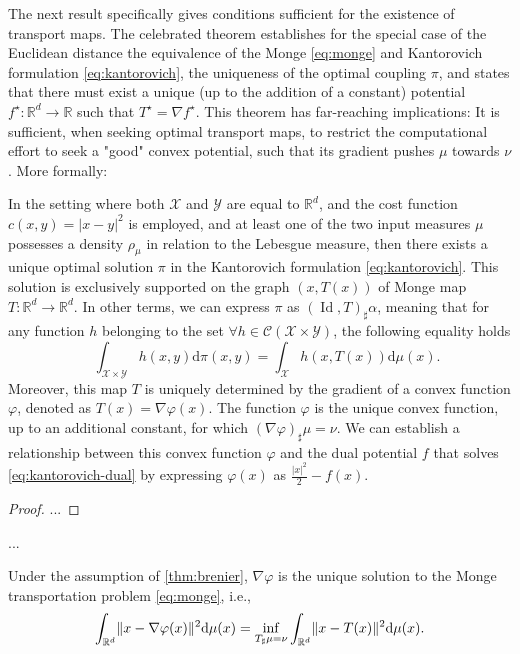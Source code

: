 The next result specifically gives conditions sufficient for the existence of transport maps.
The celebrated \citeauthor{brenier1987decomposition} theorem \citeyearpar{brenier1987decomposition} establishes for the special case of the Euclidean distance the equivalence of the Monge \eqref{eq:monge} and Kantorovich formulation  \eqref{eq:kantorovich}, the uniqueness of the optimal coupling $\pi$, and states that there must exist a unique (up to the addition of a constant) potential $f^\star:\mathbb{R}^d\rightarrow \mathbb{R}$ such that $T^\star = \nabla f^\star$. 
This theorem has far-reaching implications: It is sufficient, when seeking optimal transport maps, to restrict the computational effort to seek a "good" convex potential, such that its gradient pushes $\mu$ towards $\nu$. 
More formally:

\begin{theorem} \label{thm:brenier}
	In the setting where both $\mathcal{X}$ and $\mathcal{Y}$ are equal to $\mathbb{R}^d$, and the cost function $c(x, y) = |x-y|^2$ is employed, and at least one of the two input measures $\mu$ possesses a density $\rho_\mu$ in relation to the Lebesgue measure, then there exists a unique optimal solution $\pi$ in the Kantorovich formulation \eqref{eq:kantorovich}.
	This solution is exclusively supported on the graph $(x, T(x))$ of Monge map $T: \mathbb{R}^d \rightarrow \mathbb{R}^d$.
	In other terms, we can express $\pi$ as $(\operatorname{Id}, T)_{\sharp} \alpha$, meaning that for any function $h$ belonging to the set $\forall h \in \mathcal{C}(\mathcal{X} \times \mathcal{Y})$, the following equality holds
	$$
	\quad \int_{\mathcal{X} \times \mathcal{Y}} h(x, y) \mathrm{d} \pi(x, y)=\int_{\mathcal{X}} h(x, T(x)) \mathrm{d} \mu(x).
	$$
Moreover, this map $T$ is uniquely determined by the gradient of a convex function $\varphi$, denoted as $T(x)=\nabla \varphi(x)$. The function $\varphi$ is the unique convex function, up to an additional constant, for which $(\nabla \varphi)_{\sharp} \mu=\nu$. We can establish a relationship between this convex function $\varphi$ and the dual potential $f$ that solves \eqref{eq:kantorovich-dual} by expressing $\varphi(x)$ as $\frac{|x|^2}{2}-f(x)$.
\end{theorem}
\begin{proof}
	...
\end{proof}
...
\begin{corollary}
	Under the assumption of \cref{thm:brenier}, $\nabla \varphi$ is the unique solution to the Monge transportation problem \eqref{eq:monge}, i.e.,
	\begin{equation}
		\int_{\mathbb{R}^d} \lVert x-\nabla \varphi(x)\rVert^2 \mathrm{d}\mu(x) = \inf_{T_\sharp \mu = \nu} \int_{\mathbb{R}^d}\lVert x - T(x)\rVert^2 \mathrm{d}\mu(x).
	\end{equation}
\end{corollary}
